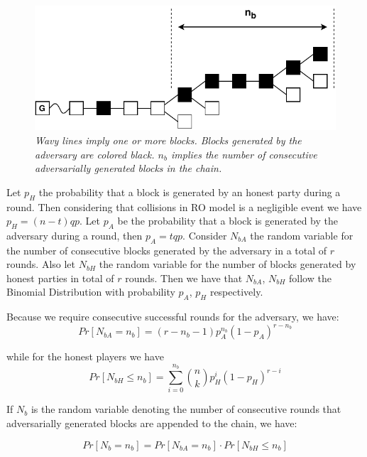 \documentclass[10pt,a4paper]{article}
\theoremstyle{plain}
\theoremstyle{definition}
\theoremstyle{lemma}
\theoremstyle{corollary}
\begin{document}
\begin{figure}[h!]
	\begin{center}
		\includegraphics[scale=0.75]{figures/infix_delay.pdf}
	\end{center}
	\caption{\textit{Wavy lines imply one or more blocks. Blocks generated by the
	 adversary are colored black. \textbf{$n_b$} implies the number of consecutive
	 adversarially generated blocks in the chain.}}
	\label{fig:infix_delay}
\end{figure}

Let $p_H$ the probability that a block is generated by an honest party during a round.
Then considering that collisions in RO model is a negligible event we have
$p_H = (n-t)qp$. Let $p_A$ be the probability that a block is generated by the
adversary during a round, then $p_A = tqp$. Consider $N_{bA}$ the random variable
for the number of consecutive blocks generated by the adversary in a total of $r$
rounds. Also let $N_{bH}$ the random variable for the number of blocks generated by
honest parties in total of $r$ rounds. 
Then we have that $N_{bA}$, $N_{bH}$ follow the Binomial Distribution with
probability $p_A$, $p_H$ respectively.

Because we require consecutive successful rounds for the adversary, we have:
\begin{equation}
	Pr[N_{bA} = n_b] = (r-n_b - 1) p_A^{n_b}(1-p_A)^{r-n_b}
\end{equation}

while for the honest players we have 
\begin{equation}
	Pr[N_{bH} \leq n_b] = \sum_{i=0}^{n_b} \binom nk p_H^{i}(1-p_H)^{r-i}
\end{equation}

If $N_b$ is the random variable denoting the number of consecutive rounds that
adversarially generated blocks are appended to the chain, we have:

\begin{equation}
	Pr[N_b = n_b] = Pr[N_{bA} = n_b] \cdot Pr[N_{bH} \leq n_b]
\end{equation}
\end{document}
